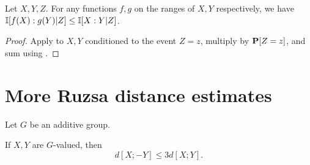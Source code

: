\begin{lemma}\label{data-process}\leanok Let $X,Y,Z$. For any functions $f, g$
on the ranges of $X, Y$ respectively, we have $\mathbb{I}[f(X) : g(Y )|Z] \leq \mathbb{I}[X :Y |Z]$.
\end{lemma}

\begin{proof}  Apply  to $X,Y$ conditioned to the event $Z=z$, multiply by ${\bf P}[Z=z]$, and sum using .
\end{proof}

\section{More Ruzsa distance estimates}

Let $G$ be an additive group.

\begin{lemma}\label{sign-flip}\leanok
  If $X,Y$ are $G$-valued, then
  $$  d[X ; -Y]  \leq 3 d[X;Y].$$
\end{lemma}

